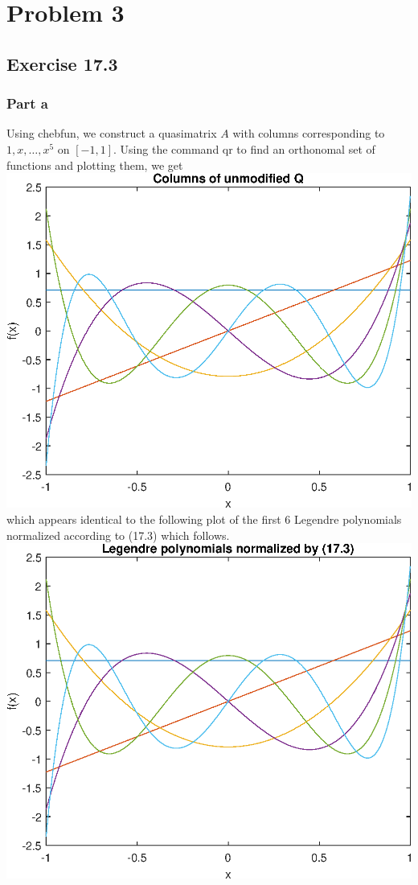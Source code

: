 \documentclass{article}
\begin{document}
\section{Problem 3}
\subsection{Exercise 17.3}
\subsubsection{Part a}
Using chebfun, we construct a quasimatrix $A$ with columns corresponding to $1,x,\ldots,x^5$ on $[-1,1]$. Using the command qr to find an orthonomal set of functions and plotting them, we get \\
\includegraphics[scale=0.6]{17_1.eps}\\
which appears identical to the following plot of the first 6 Legendre polynomials normalized according to (17.3) which follows.\\
\includegraphics[scale=0.6]{17_2.eps}\\
\end{document}
